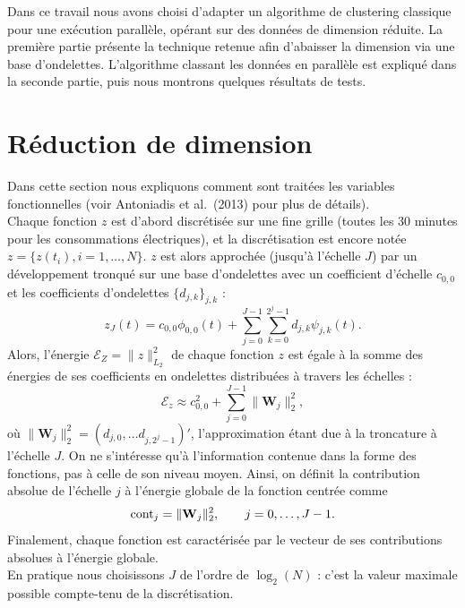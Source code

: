 \documentclass[12pt]{article}
\begin{document}
\noindent Dans ce travail nous avons choisi d'adapter un algorithme de clustering classique pour une exécution parallèle, opérant sur des données de dimension réduite. 
La première partie présente la technique retenue afin d'abaisser la dimension via une base d'ondelettes. 
L'algorithme classant les données en parallèle est expliqué dans la seconde partie, puis nous montrons quelques résultats de tests.

\section{Réduction de dimension}

Dans cette section nous expliquons comment sont traitées les variables fonctionnelles (voir Antoniadis et al.~(2013) pour plus de détails).\\

\noindent Chaque fonction $z$ est d'abord discrétisée sur une fine grille (toutes les 30 minutes pour les consommations électriques), et 
la discrétisation est encore notée $z = \{ z(t_i), i = 1, \ldots, N \}$. 
$z$ est alors approchée (jusqu'à l'échelle $J$) par un développement tronqué sur une base d'ondelettes avec un coefficient d'échelle $c_{0,0}$ 
et les coefficients d'ondelettes $\{d_{j, k}\}_{j, k}$ :
%
\begin{equation} \label{approx}
    z_J(t) = c_{0,0} \phi_{0, 0} (t) + \sum_{j=0}^{J-1} \sum_{k=0}^{2^j - 1} d_{j,k} \psi_{j, k} (t).
\end{equation}
Alors, l'énergie $\mathcal{E}_Z =  \| z \|^2_{ L_2 }$ de chaque fonction $z$ est égale à la somme des énergies 
de ses coefficients en ondelettes distribuées à travers les échelles :
%
\begin{equation} \label{scaledist}
    \mathcal{E}_z \approx c_{0,0}^2 + \sum_{j=0}^{J-1} \| \mathbf{W}_j \|^2_2,
\end{equation}
%
où $\| \mathbf{W}_j \|^2_2 = (d_{j, 0}, \ldots d_{j, 2^j - 1})'$, l'approximation étant due à la troncature à l'échelle $J$. 
On ne s'intéresse qu'à l'information contenue dans la forme des fonctions, pas à celle de son niveau moyen. 
Ainsi, on définit la contribution absolue de l'échelle $j$ à l'énergie globale de la fonction centrée comme
   \[ \hbox{cont}_j = \| \mathbf{W}_j \|^2_2, \qquad j=0,\ldots,J-1. \]
Finalement, chaque fonction est caractérisée par le vecteur de ses contributions absolues à l'énergie globale.\\

\noindent En pratique nous choisissons $J$ de l'ordre de $\log_2(N)$ : c'est la valeur maximale possible compte-tenu de la discrétisation.
\end{document}
